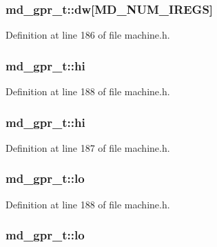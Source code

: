 \subsubsection[{dw}]{ {\bf md\_\-gpr\_\-t::dw}[MD\_\-NUM\_\-IREGS]}\label{unionmd__gpr__t_292c7746e39cc7d9de4c95d49c8b753b}




Definition at line 186 of file machine.h.
\subsubsection[{hi}]{ {\bf md\_\-gpr\_\-t::hi}}\label{unionmd__gpr__t_f81262319623e376684d4dcec482e9ac}




Definition at line 188 of file machine.h.
\subsubsection[{hi}]{ {\bf md\_\-gpr\_\-t::hi}}\label{unionmd__gpr__t_c3f694b3ba06f9bec2e1d54d179532ba}




Definition at line 187 of file machine.h.
\subsubsection[{lo}]{ {\bf md\_\-gpr\_\-t::lo}}\label{unionmd__gpr__t_219a59498275019d24b26e4eeb82722b}




Definition at line 188 of file machine.h.
\subsubsection[{lo}]{ {\bf md\_\-gpr\_\-t::lo}}\label{unionmd__gpr__t_7b003082b67e0c5472824b80d2d20791}




